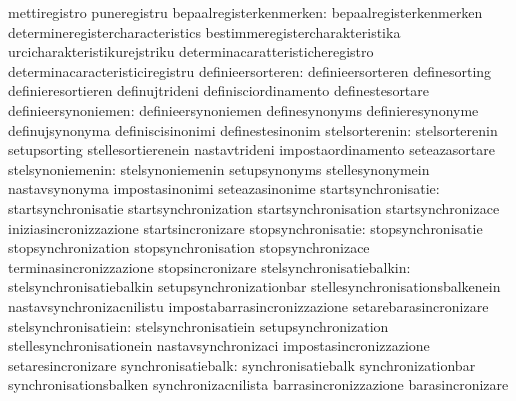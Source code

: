                                   mettiregistro                    puneregistru
         bepaalregisterkenmerken: bepaalregisterkenmerken          determineregistercharacteristics
                                  bestimmeregistercharakteristika  urcicharakteristikurejstriku
                                  determinacaratteristicheregistro determinacaracteristiciregistru
               definieersorteren: definieersorteren                definesorting
                                  definieresortieren               definujtrideni
                                  definisciordinamento             definestesortare
             definieersynoniemen: definieersynoniemen              definesynonyms
                                  definieresynonyme                definujsynonyma
                                  definiscisinonimi                definestesinonim
                  stelsorterenin: stelsorterenin                   setupsorting
                                  stellesortierenein               nastavtrideni
                                  impostaordinamento               seteazasortare
                stelsynoniemenin: stelsynoniemenin                 setupsynonyms
                                  stellesynonymein                 nastavsynonyma
                                  impostasinonimi                  seteazasinonime
             startsynchronisatie: startsynchronisatie              startsynchronization
                                  startsynchronisation             startsynchronizace
                                  iniziasincronizzazione           startsincronizare
              stopsynchronisatie: stopsynchronisatie               stopsynchronization
                                  stopsynchronisation              stopsynchronizace
                                  terminasincronizzazione          stopsincronizare
        stelsynchronisatiebalkin: stelsynchronisatiebalkin         setupsynchronizationbar
                                  stellesynchronisationsbalkenein  nastavsynchronizacnilistu
                                  impostabarrasincronizzazione     setarebarasincronizare
            stelsynchronisatiein: stelsynchronisatiein             setupsynchronization
                                  stellesynchronisationein         nastavsynchronizaci
                                  impostasincronizzazione          setaresincronizare
              synchronisatiebalk: synchronisatiebalk               synchronizationbar
                                  synchronisationsbalken           synchronizacnilista
                                  barrasincronizzazione            barasincronizare

